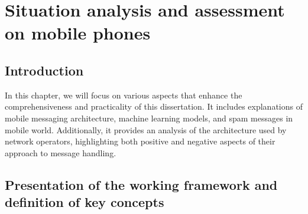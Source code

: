 \documentclass[12pt,a4paper, oneside]{book}
\begin{document}
	\chapter{Situation analysis and assessment on mobile phones}
	\section{Introduction}
	In this chapter, we will focus on various aspects that enhance the comprehensiveness and practicality of this dissertation. It includes explanations of mobile messaging architecture, machine learning models, and spam messages in mobile world. Additionally, it provides an analysis of the architecture used by network operators, highlighting both positive and negative aspects of their approach to message handling.
	\section{Presentation of the working framework and definition of key concepts}
\end{document}
